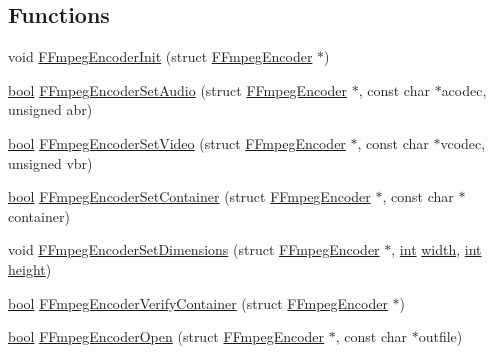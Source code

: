 \subsection*{Functions}
\begin{DoxyCompactItemize}
\item 
void \mbox{\hyperlink{ffmpeg-encoder_8h_a0204b8f313804cbd68f07e609b39a76b}{F\+Fmpeg\+Encoder\+Init}} (struct \mbox{\hyperlink{ffmpeg-encoder_8h_struct_f_fmpeg_encoder}{F\+Fmpeg\+Encoder}} $\ast$)
\item 
\mbox{\hyperlink{libretro_8h_a4a26dcae73fb7e1528214a068aca317e}{bool}} \mbox{\hyperlink{ffmpeg-encoder_8h_ae3fa582320c53317a31597aba10d7356}{F\+Fmpeg\+Encoder\+Set\+Audio}} (struct \mbox{\hyperlink{ffmpeg-encoder_8h_struct_f_fmpeg_encoder}{F\+Fmpeg\+Encoder}} $\ast$, const char $\ast$acodec, unsigned abr)
\item 
\mbox{\hyperlink{libretro_8h_a4a26dcae73fb7e1528214a068aca317e}{bool}} \mbox{\hyperlink{ffmpeg-encoder_8h_a917d76068b01c4cc7cccba88bc34afbe}{F\+Fmpeg\+Encoder\+Set\+Video}} (struct \mbox{\hyperlink{ffmpeg-encoder_8h_struct_f_fmpeg_encoder}{F\+Fmpeg\+Encoder}} $\ast$, const char $\ast$vcodec, unsigned vbr)
\item 
\mbox{\hyperlink{libretro_8h_a4a26dcae73fb7e1528214a068aca317e}{bool}} \mbox{\hyperlink{ffmpeg-encoder_8h_a5543df3e61f1004fe0a5ebb9fcd27a42}{F\+Fmpeg\+Encoder\+Set\+Container}} (struct \mbox{\hyperlink{ffmpeg-encoder_8h_struct_f_fmpeg_encoder}{F\+Fmpeg\+Encoder}} $\ast$, const char $\ast$container)
\item 
void \mbox{\hyperlink{ffmpeg-encoder_8h_acca84883ea3484ebd2b83a8378bc722b}{F\+Fmpeg\+Encoder\+Set\+Dimensions}} (struct \mbox{\hyperlink{ffmpeg-encoder_8h_struct_f_fmpeg_encoder}{F\+Fmpeg\+Encoder}} $\ast$, \mbox{\hyperlink{ioapi_8h_a787fa3cf048117ba7123753c1e74fcd6}{int}} \mbox{\hyperlink{readppm_8c_a59b7c57bf1dc7c36ac7c8232cf5bb713}{width}}, \mbox{\hyperlink{ioapi_8h_a787fa3cf048117ba7123753c1e74fcd6}{int}} \mbox{\hyperlink{readppm_8c_ac8b624a7354198da45f5797b93b883c9}{height}})
\item 
\mbox{\hyperlink{libretro_8h_a4a26dcae73fb7e1528214a068aca317e}{bool}} \mbox{\hyperlink{ffmpeg-encoder_8h_a66a59837fe117bd0a630ca71fe3cf522}{F\+Fmpeg\+Encoder\+Verify\+Container}} (struct \mbox{\hyperlink{ffmpeg-encoder_8h_struct_f_fmpeg_encoder}{F\+Fmpeg\+Encoder}} $\ast$)
\item 
\mbox{\hyperlink{libretro_8h_a4a26dcae73fb7e1528214a068aca317e}{bool}} \mbox{\hyperlink{ffmpeg-encoder_8h_a0299d242cf2dc28fcf17994c46b72faf}{F\+Fmpeg\+Encoder\+Open}} (struct \mbox{\hyperlink{ffmpeg-encoder_8h_struct_f_fmpeg_encoder}{F\+Fmpeg\+Encoder}} $\ast$, const char $\ast$outfile)

\end{DoxyCompactItemize}
